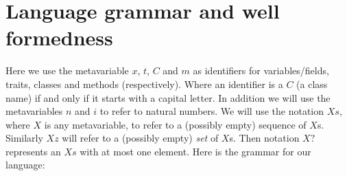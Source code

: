
\cleardoublepage
\section{Language grammar and well formedness}


Here we use the metavariable $x$, $t$, $C$ and $m$ as identifiers for variables/fields, traits, classes and methods (respectively). Where an identifier is a $C$ (a class name) if and only if it starts with a capital letter. In addition we will use the metavariables $n$ and $i$ to refer to natural numbers. We will use the notation $Xs$, where $X$ is any metavariable, to refer to a (possibly empty) sequence of $X$s. Similarly $Xz$ will refer to a (possibly empty) \emph{set} of $X$s.  Then notation $X?$ represents an $Xs$ with at most one element. Here is the grammar for our language:

